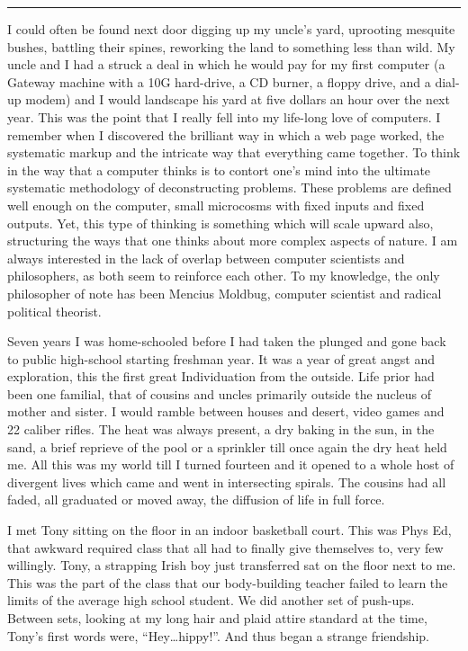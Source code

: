 \documentclass[ebook, 10pt, openright, onecolumn]{memoir}
\newcommand*\td[1]{
  \todo[inline]{
     #1 
  }
}
\newcommand*\starbreak{\fancybreak*{\Large{* * *}}}
\newcommand*\finish{\td{ ----- Finish this section -----}}
\begin{document}
\finish

\starbreak

I could often be found next door digging up my uncle's yard, uprooting mesquite
bushes, battling their spines, reworking the land to something less than wild.
My uncle and I had a struck a deal in which he would pay for my first computer
(a Gateway machine with a 10G hard-drive, a CD burner, a floppy drive, and a
dial-up modem) and I would landscape his yard at five dollars an hour over the
next year.  This was the point that I really fell into my life-long love of
computers.  I remember when I discovered the brilliant way in which a web page
worked, the systematic markup and the intricate way that everything came
together.  To think in the way that a computer thinks is to contort one's mind
into the ultimate systematic methodology of deconstructing problems.  These
problems are defined well enough on the computer, small microcosms with fixed
inputs and fixed outputs.  Yet, this type of thinking is something which will
scale upward also, structuring the ways that one thinks about more complex
aspects of nature.  I am always interested in the lack of overlap between
computer scientists and philosophers, as both seem to reinforce each other. To
my knowledge, the only philosopher of note has been Mencius Moldbug, computer
scientist and radical political theorist.  

\finish

Seven years I was home-schooled before I had taken the plunged and gone back to
public high-school starting freshman year.  It was a year of great angst and
exploration, this the first great Individuation from the outside.  Life prior
had been one familial, that of cousins and uncles primarily outside the nucleus
of mother and sister.  I would ramble between houses and desert, video games and
22 caliber rifles.  The heat was always present, a dry baking in the sun, in the
sand, a brief reprieve of the pool or a sprinkler till once again the dry heat
held me.  All this was my world till I turned fourteen and it opened to a whole
host of divergent lives which came and went in intersecting spirals.  The
cousins had all faded, all graduated or moved away, the diffusion of life in
full force.

I met Tony sitting on the floor in an indoor basketball court.  This was Phys
Ed, that awkward required class that all had to finally give themselves to, very
few willingly.  Tony, a strapping Irish boy just transferred sat on the floor
next to me. This was the part of the class that our body-building teacher failed
to learn the limits of the average high school student.  We did another set of
push-ups. Between sets, looking at my long hair and plaid attire standard at the
time, Tony's first words were, ``Hey\ldots hippy!''.  And thus began a strange
friendship.
\end{document}

